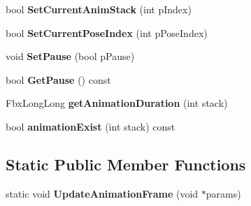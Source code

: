 \begin{DoxyCompactItemize}
\item 
\hypertarget{class_fbx_model_aff62ea1c1862ff836b8e64067ad43e6e}{bool {\bfseries Set\-Current\-Anim\-Stack} (int p\-Index)}\label{class_fbx_model_aff62ea1c1862ff836b8e64067ad43e6e}

\item 
\hypertarget{class_fbx_model_af578030bf48a40bed126422556dc58f8}{bool {\bfseries Set\-Current\-Pose\-Index} (int p\-Pose\-Index)}\label{class_fbx_model_af578030bf48a40bed126422556dc58f8}

\item 
\hypertarget{class_fbx_model_aceea77fae21327e4e8a722c37afbf183}{void {\bfseries Set\-Pause} (bool p\-Pause)}\label{class_fbx_model_aceea77fae21327e4e8a722c37afbf183}

\item 
\hypertarget{class_fbx_model_acde12b8338aab95fae10e46a8a99d53e}{bool {\bfseries Get\-Pause} () const }\label{class_fbx_model_acde12b8338aab95fae10e46a8a99d53e}

\item 
\hypertarget{class_fbx_model_adfb248604a1f2f72d6e19b3dd85bbb4f}{Fbx\-Long\-Long {\bfseries get\-Animation\-Duration} (int stack)}\label{class_fbx_model_adfb248604a1f2f72d6e19b3dd85bbb4f}

\item 
\hypertarget{class_fbx_model_a423354d364254426861f03f9c6409e57}{bool {\bfseries animation\-Exist} (int stack) const }\label{class_fbx_model_a423354d364254426861f03f9c6409e57}

\end{DoxyCompactItemize}
\subsection*{Static Public Member Functions}
\begin{DoxyCompactItemize}
\item 
\hypertarget{class_fbx_model_a83b51e49ba5f713081826f4796f0d1df}{static void {\bfseries Update\-Animation\-Frame} (void $\ast$params)}\label{class_fbx_model_a83b51e49ba5f713081826f4796f0d1df}

\end{DoxyCompactItemize}
